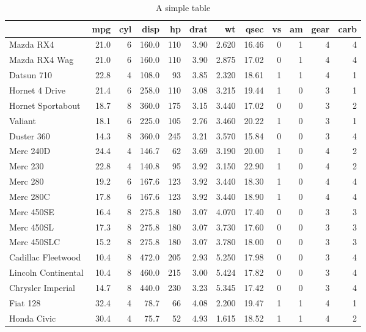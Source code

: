 \documentclass[11pt]{article}
\begin{document}
\begin{table}

\caption{A simple table}
\begin{tabular}{l|r|r|r|r|r|r|r|r|r|r|r}
\hline
  & mpg & cyl & disp & hp & drat & wt & qsec & vs & am & gear & carb\\
\hline
Mazda RX4 & 21.0 & 6 & 160.0 & 110 & 3.90 & 2.620 & 16.46 & 0 & 1 & 4 & 4\\
\hline
Mazda RX4 Wag & 21.0 & 6 & 160.0 & 110 & 3.90 & 2.875 & 17.02 & 0 & 1 & 4 & 4\\
\hline
Datsun 710 & 22.8 & 4 & 108.0 & 93 & 3.85 & 2.320 & 18.61 & 1 & 1 & 4 & 1\\
\hline
Hornet 4 Drive & 21.4 & 6 & 258.0 & 110 & 3.08 & 3.215 & 19.44 & 1 & 0 & 3 & 1\\
\hline
Hornet Sportabout & 18.7 & 8 & 360.0 & 175 & 3.15 & 3.440 & 17.02 & 0 & 0 & 3 & 2\\
\hline
Valiant & 18.1 & 6 & 225.0 & 105 & 2.76 & 3.460 & 20.22 & 1 & 0 & 3 & 1\\
\hline
Duster 360 & 14.3 & 8 & 360.0 & 245 & 3.21 & 3.570 & 15.84 & 0 & 0 & 3 & 4\\
\hline
Merc 240D & 24.4 & 4 & 146.7 & 62 & 3.69 & 3.190 & 20.00 & 1 & 0 & 4 & 2\\
\hline
Merc 230 & 22.8 & 4 & 140.8 & 95 & 3.92 & 3.150 & 22.90 & 1 & 0 & 4 & 2\\
\hline
Merc 280 & 19.2 & 6 & 167.6 & 123 & 3.92 & 3.440 & 18.30 & 1 & 0 & 4 & 4\\
\hline
Merc 280C & 17.8 & 6 & 167.6 & 123 & 3.92 & 3.440 & 18.90 & 1 & 0 & 4 & 4\\
\hline
Merc 450SE & 16.4 & 8 & 275.8 & 180 & 3.07 & 4.070 & 17.40 & 0 & 0 & 3 & 3\\
\hline
Merc 450SL & 17.3 & 8 & 275.8 & 180 & 3.07 & 3.730 & 17.60 & 0 & 0 & 3 & 3\\
\hline
Merc 450SLC & 15.2 & 8 & 275.8 & 180 & 3.07 & 3.780 & 18.00 & 0 & 0 & 3 & 3\\
\hline
Cadillac Fleetwood & 10.4 & 8 & 472.0 & 205 & 2.93 & 5.250 & 17.98 & 0 & 0 & 3 & 4\\
\hline
Lincoln Continental & 10.4 & 8 & 460.0 & 215 & 3.00 & 5.424 & 17.82 & 0 & 0 & 3 & 4\\
\hline
Chrysler Imperial & 14.7 & 8 & 440.0 & 230 & 3.23 & 5.345 & 17.42 & 0 & 0 & 3 & 4\\
\hline
Fiat 128 & 32.4 & 4 & 78.7 & 66 & 4.08 & 2.200 & 19.47 & 1 & 1 & 4 & 1\\
\hline
Honda Civic & 30.4 & 4 & 75.7 & 52 & 4.93 & 1.615 & 18.52 & 1 & 1 & 4 & 2\\

\end{tabular}
\end{table}
\end{document}

